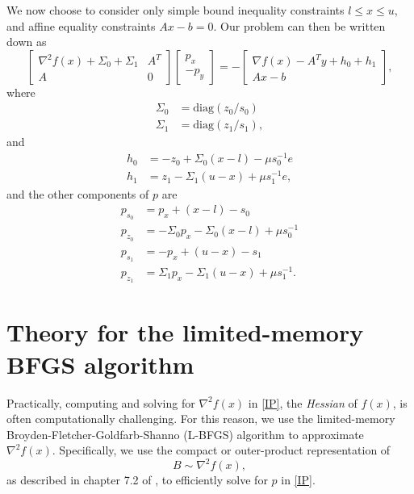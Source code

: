 \documentclass{article}
\begin{document}
We now choose to consider only  
    simple bound inequality constraints $l \le x \le u$, and
    affine equality constraints $A x - b = 0$.
Our problem can then be written down as
\begin{equation}
\begin{bmatrix}
    \nabla^2 f(x) + \Sigma_0 + \Sigma_1 & A^T \\
    A & 0 
\end{bmatrix}
\begin{bmatrix} p_x \\ -p_y \end{bmatrix}
    = -
\begin{bmatrix}
    \nabla f(x) - A^T y + h_0 + h_1 \\ A x - b
\end{bmatrix},
\label{IP}
\end{equation}
    where
    \begin{subequations}\begin{align}
    \Sigma_0 &= \text{diag}(z_0 / s_0) \\
    \Sigma_1 &= \text{diag}(z_1 / s_1),
    \end{align}\end{subequations}
    and
    \begin{subequations}\begin{align}
    h_0 &= -z_0 + \Sigma_0 (x - l) - \mu s_0^{-1} e \\
    h_1 &= z_1 - \Sigma_1 (u - x) + \mu s_1^{-1} e, 
    \end{align}\end{subequations}
    and the other components of $p$ are
\begin{subequations}\begin{align}
    p_{s_0} &= p_x + (x - l) - s_0 \\
    p_{z_0} &= -\Sigma_0 p_x - \Sigma_0 (x - l) + \mu s_0^{-1} \\
    p_{s_1} &= -p_x + (u - x) - s_1 \\
    p_{z_1} &= \Sigma_1 p_x - \Sigma_1 (u - x) + \mu s_1^{-1}.
\end{align}\label{p_other}\end{subequations}

\section{Theory for the limited-memory BFGS algorithm}
Practically, computing and solving for $\nabla^2 f(x)$ in \eqref{IP}, 
    the \emph{Hessian} of $f(x)$, is often computationally challenging.
For this reason, we use the 
    limited-memory Broyden-Fletcher-Goldfarb-Shanno (L-BFGS) algorithm
    to approximate $\nabla^2 f(x)$.
Specifically, we use the compact or outer-product representation of 
    \begin{equation} B \sim \nabla^2 f(x), \end{equation}
    as described in chapter 7.2 of \cite{NW04},
    to efficiently solve for $p$ in \eqref{IP}.
\end{document}

